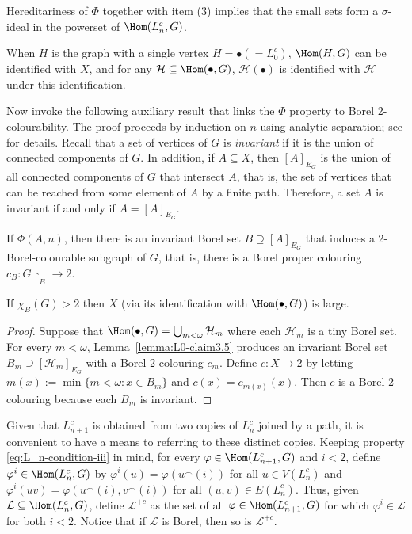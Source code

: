 Hereditariness of $\Phi$ together with item (3) implies that the small sets form a $\sigma$-ideal in the powerset of $\Hom(L^c_n,G)$.

When $H$ is the graph with a single vertex $H=\bullet\left(=L^c_0\right)$, $\Hom(H,G)$ can be identified with $X$, and for any $\mathcal H\subseteq\Hom(\bullet,G)$, $\mathcal H(\bullet)$ is identified with $\mathcal H$ under this identification.

Now invoke the following auxiliary result that links the $\Phi$ property to Borel 2-colourability.
The proof proceeds by induction on $n$ using analytic separation; see \cite[Claims~3.3--3.5]{L0paper} for details.
Recall that a set of vertices of $G$ is \emph{invariant} if it is the union of connected components of $G$.
In addition, if $A\subseteq X$, then $[A]_{E_G}$ is the union of all connected components of $G$ that intersect $A$, that is, the set of vertices that can be reached from some element of $A$ by a finite path.
Therefore, a set $A$ is invariant if and only if $A=[A]_{E_G}$.

\begin{lemma}\label{lemma:L0-claim3.5}
    If $\Phi(A,n)$, then there is an invariant Borel set $B\supseteq[A]_{E_G}$ that induces a 2-Borel-colourable subgraph of $G$, that is, there is a Borel proper colouring $c_B\colon G\restriction_B\to2$.
\end{lemma}

\begin{proposition}\label{prop:small}
    If $\chi_B(G)>2$ then $X$ (via its identification with $\Hom(\bullet,G)$) is large.
\end{proposition}

\begin{proof}
    Suppose that $\Hom(\bullet,G)=\bigcup_{m<\omega}\mathcal H_m$ where each $\mathcal H_m$ is a tiny Borel set.
    For every $m<\omega$, Lemma~\ref{lemma:L0-claim3.5} produces an invariant Borel set $B_m\supseteq[\mathcal H_m]_{E_G}$ with a Borel 2-colouring $c_m$.
    Define $c\colon X\to2$ by letting $m(x):=\min\{m<\omega:x\in B_m\}$ and $c(x)=c_{m(x)}(x)$.
    Then $c$ is a Borel 2-colouring because each $B_m$ is invariant.
\end{proof}

Given that $L^c_{n+1}$ is obtained from two copies of $L^c_n$ joined by a path, it is convenient to have a means to referring to these distinct copies.
Keeping property \eqref{eq:L_n-condition-iii} in mind, for every $\varphi\in\Hom(L^c_{n+1},G)$ and $i<2$, define $\varphi^i\in\Hom(L^c_n,G)$ by $\varphi^i(u)=\varphi(u^\frown (i))$ for all $u\in V(L^c_n)$ and $\varphi^i(uv)=\varphi(u^\frown(i),v^\frown(i))$ for all $(u,v)\in E(L^c_n)$.
Thus, given $\mathcal L\subseteq\Hom(L^c_n,G)$, define $\mathcal L^{+c}$ as the set of all $\varphi\in\Hom(L^c_{n+1},G)$ for which $\varphi^i\in\mathcal L$ for both $i<2$.
Notice that if $\mathcal L$ is Borel, then so is $\mathcal L^{+c}$.

